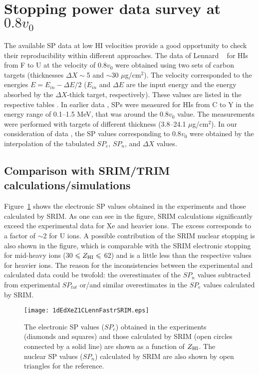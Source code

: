 \documentclass[aps,pra,twocolumn,amsmath,amssymb,floatfix]{revtex4-2}
\begin{document}
\section{Stopping power data survey at $0.8 v_{0}$}

The available SP data at low HI velocities \cite{Fastrup66,Hvelp68,Lennard86} provide a good opportunity to check their reproducibility within different approaches. The data of Lennard \ea\ \cite{Lennard86} for HIs from F to U at the velocity of $0.8 v_{0}$ were obtained using two sets of carbon targets (thicknesses $\Delta X \sim$5 and $\sim$30 $\mu$g/cm$^{2}$). The velocity corresponded to the energies $E = E_{in} - \Delta E / 2$ ($E_{in}$ and $\Delta E$ are the input energy and the energy absorbed by the $\Delta X$-thick target, respectively). These values are listed in the respective tables \cite{Lennard86}. In earlier data \cite{Fastrup66,Hvelp68}, SPs were measured for HIs from C to Y in the energy range of 0.1--1.5 MeV, that was around the $0.8 v_{0}$ value. The measurements were performed with targets of different thickness (3.8--24.1 $\mu$g/cm$^{2}$). In our consideration of data \cite{Fastrup66,Hvelp68}, the SP values corresponding to $0.8 v_{0}$ were obtained by the interpolation of the tabulated $SP_{e}$, $SP_{n}$, and $\Delta X$ values.


\subsection{\label{SRIMTRIMcomp}Comparison with SRIM/TRIM calculations/simulations}

Figure~\ref{SPeSRIMcomp} shows the electronic SP values obtained in the experiments \cite{Fastrup66,Hvelp68,Lennard86} and those calculated by SRIM. As one can see in the figure, SRIM calculations significantly exceed the experimental data for Xe and heavier ions. The excess corresponds to a factor of $\sim$2 for U ions. A possible contribution of the SRIM nuclear stopping is also shown in the figure, which is comparable with the SRIM electronic stopping for mid-heavy ions (30 $\leqslant Z_{\rm HI} \leqslant$ 62) and is a little less than the respective values for heavier ions. The reason for the inconsistencies between the experimental and calculated data could be twofold: the overestimates of the $SP_{n}$ values subtracted from experimental $SP_{tot}$ \cite{Lennard86} or/and similar overestimates in the $SP_{e}$ values calculated by SRIM.

\begin{figure}[!h]  %
\begin{center}
\texttt{[image: 1dEdXeZ1CLennFastrSRIM.eps]}
\caption{\label{SPeSRIMcomp}The electronic SP values ($SP_{e}$) obtained in the experiments \cite{Fastrup66,Hvelp68,Lennard86} (diamonds and squares) and those calculated by SRIM (open circles connected by a solid line) are shown as a function of $Z_{\rm HI}$. The nuclear SP values ($SP_{n}$) calculated by SRIM are also shown by open triangles for the reference.}
\end{center}
\end{figure}
\end{document}
